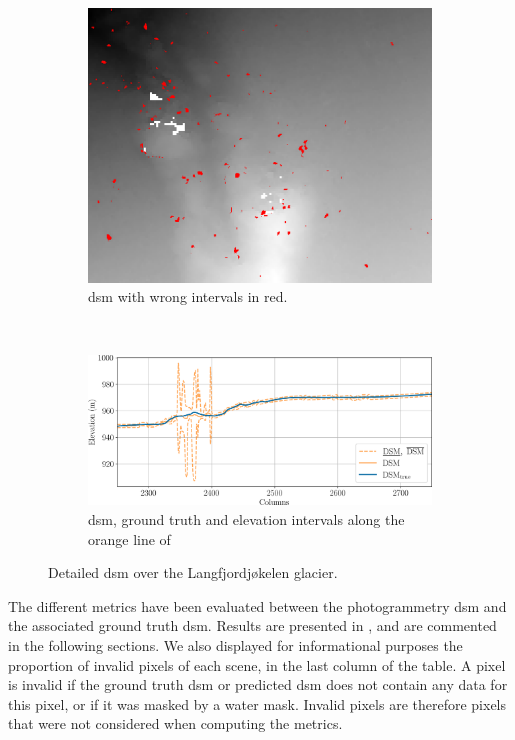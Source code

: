 \begin{figure}
\begin{subfigure}[t]{0.3\linewidth}
        \flushright
        \includegraphics[width=0.809\linewidth]{Images/Chap_6/Langfjordjokelen_error_zoom_1850-2250_2250-2750.png}
        \caption{\acrshort{dsm} with wrong intervals in red.}
        \label{fig:langfjordjokelen_error_zoom}
    \end{subfigure}\\
    \begin{subfigure}[t]{\linewidth}
        \centering
        \includegraphics[width=\linewidth]{Images/Chap_6/Langfjordjokelen_row_2000.png}
        \caption{\acrshort{dsm}, ground truth and elevation intervals along the orange line of }
        \label{fig:langfjordjokelen_zoom_row}
    \end{subfigure}
    \caption{Detailed \acrshort{dsm} over the Langfjordjøkelen glacier.}
    \label{fig:langfjordjokelen_zoom}
\end{figure}

The different metrics have been evaluated between the photogrammetry \acrshort{dsm} and the associated ground truth \acrshort{dsm}. Results are presented in , and are commented in the following sections. We also displayed for informational purposes the proportion of invalid pixels of each scene, in the last column of the table. A pixel is invalid if the ground truth \acrshort{dsm} or predicted \acrshort{dsm} does not contain any data for this pixel, or if it was masked by a water mask. Invalid pixels are therefore pixels that were not considered when computing the metrics.

